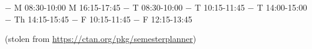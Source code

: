 \documentclass[a4paper, 12pt]{scrartcl}
\begin{document}


\newlength{\timetableWidthI}
\settowidth{\timetableWidthI}{12:30}
\addtolength{\timetableWidthI}{2em}

\newlength{\timetableWidthII}
\setlength{\timetableWidthII}{-\timetableWidthI}
\addtolength{\timetableWidthII}{1.2\textwidth}

\begin{timetable}[days={Mon,Thue,Wend,Thur,Fri}, end time/.evaluated={21*60}, length=15, width=\timetableWidthII]
	 {−}    {\zoom}  {M}  {08:30-10:00} {\phigh}      {}
	             {\tbd} {\teams} {M}  {16:15-17:45} {\pmid}       {}
	 {−}    {\zoom}  {T}  {08:30-10:00} {\phigh}      {}
	             {−}    {\teams} {T}  {10:15-11:45} {\pmid}       {}
	         {−}    {\teams} {T}  {14:00-15:00} {\phigh}      {}
	             {−}    {\teams} {Th} {14:15-15:45} {\pmid}       {}
	                 {−}    {\teams} {F}  {10:15-11:45} {}            {}
	      {−}    {\zoom}  {F}  {12:15-13:45} {\pmandatory} {}
\end{timetable}
(stolen from \url{https://ctan.org/pkg/semesterplanner})

\begin{deadlines}
\end{deadlines}

\begin{exams}
\end{exams}

\begin{appointments}
\end{appointments}
\end{document}
